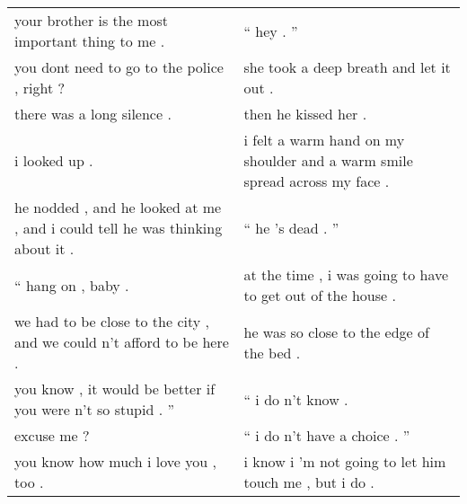\documentclass{article}
\begin{document}
\begin{table}[!h]
\begin{center}
{\begin{small}
\begin{tabular}{ll}
                                    your brother is the most important thing to me .                               &                                                                            `` hey . ''                                     \\
                                          you dont need to go to the police , right ?                              &                                                      she took a deep breath and let it out .                               \\
                                                      there was a long silence .                                   &                                                                    then he kissed her .                                    \\
                                                                 i looked up .                                     &                          i felt a warm hand on my shoulder and a warm smile spread across my face .                        \\
                he nodded , and he looked at me , and i could tell he was thinking about it .                      &                                                                       `` he 's dead . ''                                   \\
                                                             `` hang on , baby .                                   &                                        at the time , i was going to have to get out of the house .                         \\
                       we had to be close to the city , and we could n't afford to be here .                       &                                                      he was so close to the edge of the bed .                              \\
                             you know , it would be better if you were n't so stupid . ''                          &                                                                       `` i do n't know .                                   \\
                                                                  excuse me ?                                      &                                                              `` i do n't have a choice . ''                                \\
                                                you know how much i love you , too .                               &                                             i know i 'm not going to let him touch me , but i do .                         \\

\end{tabular}
\end{small}}
\end{center}
\end{table}
\end{document}
